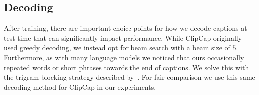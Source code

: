 \documentclass{article} %
\begin{document}

\subsection{Decoding}

After training, there are important choice points for how we decode captions at test time that can significantly impact performance.
While ClipCap originally used greedy decoding, we instead opt for beam search with a beam size of $5$.
Furthermore, as with many language models we noticed that ours occasionally repeated words or short phrases towards the end of captions.
We solve this with the trigram blocking strategy described by~\citet{trigram}.
For fair comparison we use this same decoding method for ClipCap in our experiments.
\end{document}
